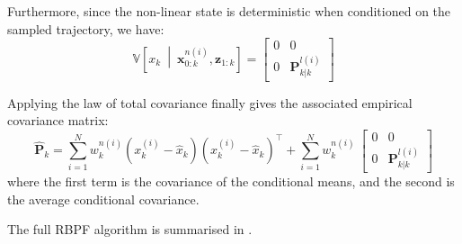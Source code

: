Furthermore, since the non-linear state is deterministic when conditioned on the sampled trajectory, we have:
\begin{equation}
	\mathbb{V}\left[x_k\:\middle|\:\mathbf{x}_{0:k}^{n(i)},\mathbf{z}_{1:k}\right]=\begin{bmatrix}0&0\\0&\mathbf{P}_{k|k}^{l(i)}\end{bmatrix}
\end{equation}

Applying the law of total covariance finally gives the associated empirical covariance matrix:
\begin{equation}
	\hat{\mathbf{P}}_k=\sum_{i=1}^Nw_k^{n(i)}\left(x_k^{(i)}-\hat{x}_k\right)\left(x_k^{(i)}-\hat{x}_k\right)^\top+\sum_{i=1}^Nw_k^{n(i)}\:\begin{bmatrix}0&0\\0&\mathbf{P}_{k|k}^{l(i)}\end{bmatrix}
\end{equation}
where the first term is the covariance of the conditional means, and the second is the average conditional covariance.

The full RBPF algorithm is summarised in .

\begin{algorithm}[!htb]
	\begin{algorithmic}
	\end{algorithmic}\caption{Rao-Blackwellised Particle Filter}\label{alg:RBPF}
\end{algorithm}

